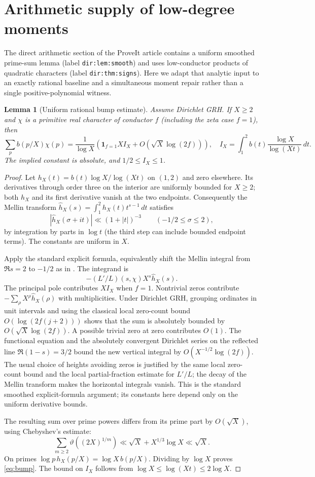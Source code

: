 \documentclass[11pt]{article}
\newtheorem{lemma}[theorem]{Lemma}
\theoremstyle{remark}\newtheorem{remark}[theorem]{Remark}
\begin{document}
\section{Arithmetic supply of low-degree moments}\label{sec:arithmetic}
The direct arithmetic section of the ProveIt article contains a uniform smoothed prime-sum lemma (label \texttt{dir:lem:smooth}) and uses low-conductor products of quadratic characters (label \texttt{dir:thm:signs}). Here we adapt that analytic input to an exactly rational baseline and a simultaneous moment repair rather than a single positive-polynomial witness.
\begin{lemma}[Uniform rational bump estimate]\label{lem:bump}
Assume Dirichlet GRH. If $X\ge2$ and $\chi$ is a primitive real character of conductor $f$ (including the zeta case $f=1$), then
\begin{equation}\label{eq:bump}
 \sum_{p}b(p/X)\chi(p)=\frac{1}{\log X}\left(\mathbf1_{f=1} X I_X+O(\sqrt X\log(2f))\right),\quad
 I_X=\int_1^2 b(t)\frac{\log X}{\log(Xt)}\,dt.
\end{equation}
The implied constant is absolute, and $1/2\le I_X\le1$.
\end{lemma}
\begin{proof}
Let $h_X(t)=b(t)\log X/\log(Xt)$ on $(1,2)$ and zero elsewhere. Its derivatives through order three on the interior are uniformly bounded for $X\ge2$; both $h_X$ and its first derivative vanish at the two endpoints. Consequently the Mellin transform $\widehat h_X(s)=\int_1^2 h_X(t)t^{s-1}\,dt$ satisfies
\[
 |\widehat h_X(\sigma+it)|\ll (1+|t|)^{-3}\qquad(-1/2\le\sigma\le2),
\]
by integration by parts in $\log t$ (the third step can include bounded endpoint terms). The constants are uniform in $X$.

Apply the standard explicit formula, equivalently shift the Mellin integral from $\Re s=2$ to $-1/2$ as in \cite{davenport,article}. The integrand is
\[ -(L'/L)(s,\chi)X^s\widehat h_X(s). \] The principal pole contributes $XI_X$ when $f=1$. Nontrivial zeros contribute $-\sum_\rho X^\rho\widehat h_X(\rho)$ with multiplicities. Under Dirichlet GRH, grouping ordinates in unit intervals and using the classical local zero-count bound $O(\log(2f(j+2)))$ shows that the sum is absolutely bounded by $O(\sqrt X\log(2f))$. A possible trivial zero at zero contributes $O(1)$. The functional equation and the absolutely convergent Dirichlet series on the reflected line $\Re(1-s)=3/2$ bound the new vertical integral by $O(X^{-1/2}\log(2f))$. The usual choice of heights avoiding zeros is justified by the same local zero-count bound and the local partial-fraction estimate for $L'/L$; the decay of the Mellin transform makes the horizontal integrals vanish. This is the standard smoothed explicit-formula argument; its constants here depend only on the uniform derivative bounds.

The resulting sum over prime powers differs from its prime part by $O(\sqrt X)$, using Chebyshev's estimate:
\[ \sum_{m\ge2}\vartheta((2X)^{1/m})\ll\sqrt X+X^{1/3}\log X\ll\sqrt X. \] On primes $\log p\,h_X(p/X)=\log X\,b(p/X)$. Dividing by $\log X$ proves \eqref{eq:bump}. The bound on $I_X$ follows from $\log X\le\log(Xt)\le2\log X$.
\end{proof}
\end{document}
